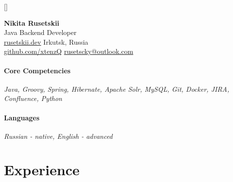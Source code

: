 \documentclass[10pt]{article}
\begin{document}
\titleformat{\section}{\vspace{-8pt}\scshape\raggedright\Large}{}{0em}{}[\color{black}\titlerule \vspace{-8pt}]


\noindent
\Large{\textbf{Nikita Rusetskii}}\vspace{4pt}
\\
\large{Java Backend Developer}\vspace{4pt}
\\
\normalsize\href{https://rusetskii.dev/}{rusetskii.dev}\normalsize
\hfill Irkutsk, Russia
\\
\href{https://github.com/xtenzQ}{github.com/xtenzQ}
\hfill
\href{mailto:rusetscky@outlook.com}{rusetscky@outlook.com}

\paragraph{\noindent\textbf{Core Competencies}\vspace{1pt}}\mbox{}\par\nobreak\noindent
\textit{Java, Groovy, Spring, Hibernate, Apache Solr, MySQL, Git, Docker, JIRA, Confluence, Python}

\paragraph{\noindent\textbf{Languages}\vspace{1pt}}\mbox{}\par\nobreak\noindent
\textit{Russian - native, English - advanced}



\section{Experience}
\paragraph{}
\end{document}
